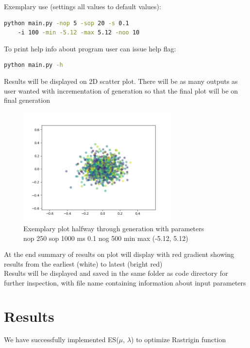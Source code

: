\documentclass{article}[12pt]
\begin{document}
Exemplary use (settings all values to default values):
\begin{lstlisting}[language=bash]
    python main.py -nop 5 -sop 20 -s 0.1
    -i 100 -min -5.12 -max 5.12 -noo 10
\end{lstlisting}
To print help info about program user can issue help flag:
\begin{lstlisting}[language=bash]
    python main.py -h
\end{lstlisting}
Results will be displayed on 2D scatter plot. There will be as many outputs as user wanted with incrementation of generation so that the final plot will be on final generation \\ 
\begin{figure}[H]
    \caption{Exemplary plot halfway through generation with parameters \\ nop 250 sop 1000 ms 0.1 nog 500 min max (-5.12, 5.12) }
    \includegraphics[width=8cm]{example_halfway.jpg}
    \centering
    \end{figure}
At the end summary of results on plot will display with red gradient showing results from the earliest (white) to latest (bright red) \\  
Results will be displayed and saved in the same folder as code directory for further inspection, with file name containing information about input parameters 
\section{Results}
We have successfully implemented ES($\mu$, $\lambda$) to optimize Rastrigin function
\end{document}
